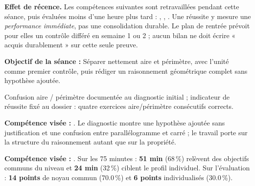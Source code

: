 \documentclass[10pt,a4paper]{article}
\begin{document}
\begin{warningbox}\textbf{Effet de récence.} Les compétences suivantes sont retravaillées pendant cette séance, puis évaluées moins d'une heure plus tard : , , . Une réussite y mesure une \emph{performance immédiate}, pas une consolidation durable. Le plan de rentrée prévoit pour elles un contrôle différé en semaine 1 ou 2 ; aucun bilan ne doit écrire « acquis durablement » sur cette seule preuve.\end{warningbox}
\begin{goalbox}\textbf{Objectif de la séance :} Séparer nettement aire et périmètre, avec l'unité comme premier contrôle, puis rédiger un raisonnement géométrique complet sans hypothèse ajoutée.\end{goalbox}
Confusion aire / périmètre documentée au diagnostic initial ; indicateur de réussite fixé au dossier : quatre exercices aire/périmètre consécutifs corrects.
\par\vspace{1mm}\textbf{Compétence visée :} .
Le diagnostic montre une hypothèse ajoutée sans justification et une confusion entre parallélogramme et carré ; le travail porte sur la structure du raisonnement autant que sur la propriété.
\par\vspace{1mm}\textbf{Compétence visée :} .
Sur les 75 minutes : \textbf{51 min} (68\,\%) relèvent des objectifs communs du niveau et \textbf{24 min} (32\,\%) ciblent le profil individuel. Sur l'évaluation : \textbf{14 points} de noyau commun (70.0\,\%) et \textbf{6 points} individualisés (30.0\,\%).
\newpage{}
\end{document}
